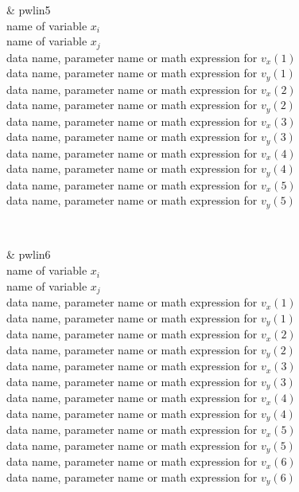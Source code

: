 \hspace*{18ex}\parbox[t]{\textwidth}{\sf 
\& pwlin5\\
name of variable $x_i$\\
name of variable $x_j$\\
data name, parameter name or math expression for $v_x(1)$ \\
data name, parameter name or math expression for $v_y(1)$ \\
data name, parameter name or math expression for $v_x(2)$ \\
data name, parameter name or math expression for $v_y(2)$ \\
data name, parameter name or math expression for $v_x(3)$ \\
data name, parameter name or math expression for $v_y(3)$ \\
data name, parameter name or math expression for $v_x(4)$ \\
data name, parameter name or math expression for $v_y(4)$ \\
data name, parameter name or math expression for $v_x(5)$ \\
data name, parameter name or math expression for $v_y(5)$
}

~

\hspace*{18ex}\parbox[t]{\textwidth}{\sf 
\& pwlin6\\
name of variable $x_i$\\
name of variable $x_j$\\
data name, parameter name or math expression for $v_x(1)$\\
data name, parameter name or math expression for $v_y(1)$\\
data name, parameter name or math expression for $v_x(2)$\\
data name, parameter name or math expression for $v_y(2)$\\
data name, parameter name or math expression for $v_x(3)$\\
data name, parameter name or math expression for $v_y(3)$\\
data name, parameter name or math expression for $v_x(4)$\\
data name, parameter name or math expression for $v_y(4)$\\
data name, parameter name or math expression for $v_x(5)$\\
data name, parameter name or math expression for $v_y(5)$\\
data name, parameter name or math expression for $v_x(6)$\\
data name, parameter name or math expression for $v_y(6)$
}

